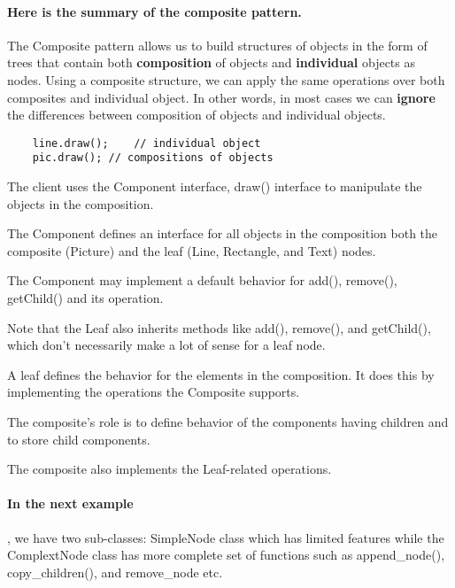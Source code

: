 \documentclass{book}
\begin{document}
\paragraph{Here is the summary of the composite pattern.}
    The Composite pattern allows us to build structures of objects in the form of trees that contain both \textbf{composition} of objects and \textbf{individual} objects as nodes.
    Using a composite structure, we can apply the same operations over both composites and individual object.
    In other words, in most cases we can \textbf{ignore} the differences between composition of objects and individual objects.
\begin{verbatim}
    line.draw();	// individual object
    pic.draw();	// compositions of objects
\end{verbatim}
    The client uses the Component interface, draw() interface to manipulate the objects in the composition.

    The Component defines an interface for all objects in the composition both the composite (Picture) and the leaf (Line, Rectangle, and Text) nodes.

    The Component may implement a default behavior for add(), remove(), getChild() and its operation.

    Note that the Leaf also inherits methods like add(), remove(), and getChild(), which don't necessarily make a lot of sense for a leaf node.

    A leaf defines the behavior for the elements in the composition. It does this by implementing the operations the Composite supports.

    The composite's role is to define behavior of the components having children and to store child components.

    The composite also implements the Leaf-related operations.

\paragraph{In the next example}, we have two sub-classes: SimpleNode class which has limited features while the ComplextNode class has more complete set of functions
such as append\_node(), copy\_children(), and remove\_node etc.
\end{document}
